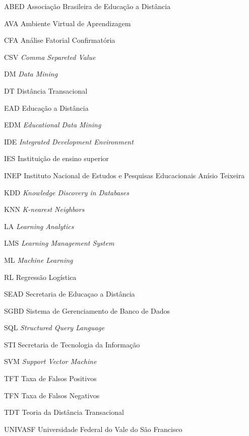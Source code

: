 \begin{siglas}
  \item[ABED] Associação Brasileira de Educação a Distância
  \item[AVA] Ambiente Virtual de Aprendizagem
  \item[CFA] Análise Fatorial Confirmatória
  \item[CSV] \textit{Comma Separeted Value}
  \item[DM] \textit{Data Mining}
  \item[DT] Distância Transacional
  \item[EAD] Educação a Distância
  \item[EDM] \textit{Educational Data Mining}
  \item[IDE] \textit{Integrated Development Environment}
  \item[IES] Instituição de ensino superior
  \item[INEP] Instituto Nacional de Estudos e Pesquisas Educacionais Anísio Teixeira
  \item[KDD] \textit{Knowledge Discovery in Databases}
  \item[KNN] \textit{K-nearest Neighbors}
  \item[LA] \textit{Learning Analytics}
  \item[LMS] \textit{Learning Management System}
  \item[ML] \textit{Machine Learning}
  \item[RL] Regressão Logística
  \item[SEAD] Secretaria de Educaçao a Distância
  \item[SGBD] Sistema de Gerenciamento de Banco de Dados
  \item[SQL] \textit{Structured Query Language}
  \item[STI] Secretaria de Tecnologia da Informação
  \item[SVM] \textit{Support Vector Machine}
  \item[TFT] Taxa de Falsos Positivos
  \item[TFN] Taxa de Falsos Negativos
  \item[TDT] Teoria da Distância Transacional
  \item[UNIVASF] Universidade Federal do Vale do São Francisco
\end{siglas}

\tableofcontents*
\cleardoublepage
